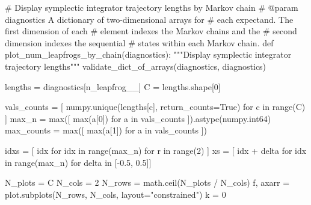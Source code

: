 \documentclass[
  letterpaper,
  DIV=11,
  numbers=noendperiod]{scrartcl}
\newenvironment{Shaded}{\begin{snugshade}}{\end{snugshade}}
\newcommand{\BuiltInTok}[1]{\textcolor[rgb]{0.00,0.23,0.31}{#1}}
\newcommand{\CommentTok}[1]{\textcolor[rgb]{0.37,0.37,0.37}{#1}}
\newcommand{\ControlFlowTok}[1]{\textcolor[rgb]{0.00,0.23,0.31}{#1}}
\newcommand{\DecValTok}[1]{\textcolor[rgb]{0.68,0.00,0.00}{#1}}
\newcommand{\FloatTok}[1]{\textcolor[rgb]{0.68,0.00,0.00}{#1}}
\newcommand{\KeywordTok}[1]{\textcolor[rgb]{0.00,0.23,0.31}{#1}}
\newcommand{\NormalTok}[1]{\textcolor[rgb]{0.00,0.23,0.31}{#1}}
\newcommand{\OperatorTok}[1]{\textcolor[rgb]{0.37,0.37,0.37}{#1}}
\newcommand{\StringTok}[1]{\textcolor[rgb]{0.13,0.47,0.30}{#1}}
\newcommand{\VariableTok}[1]{\textcolor[rgb]{0.07,0.07,0.07}{#1}}
\begin{document}
\begin{Shaded}
\begin{Highlighting}[]
\CommentTok{\# Display symplectic integrator trajectory lengths by Markov chain}
\CommentTok{\# @param diagnostics A dictionary of two{-}dimensional arrays for}
\CommentTok{\#                    each expectand.  The first dimension of each}
\CommentTok{\#                    element indexes the Markov chains and the}
\CommentTok{\#                    second dimension indexes the sequential}
\CommentTok{\#                    states within each Markov chain.}
\KeywordTok{def}\NormalTok{ plot\_num\_leapfrogs\_by\_chain(diagnostics):}
  \CommentTok{"""Display symplectic integrator trajectory lengths"""}
\NormalTok{  validate\_dict\_of\_arrays(diagnostics, }\StringTok{\textquotesingle{}diagnostics\textquotesingle{}}\NormalTok{)}

\NormalTok{  lengths }\OperatorTok{=}\NormalTok{ diagnostics[}\StringTok{\textquotesingle{}n\_leapfrog\_\_\textquotesingle{}}\NormalTok{]}
\NormalTok{  C }\OperatorTok{=}\NormalTok{ lengths.shape[}\DecValTok{0}\NormalTok{]}

\NormalTok{  vals\_counts }\OperatorTok{=}\NormalTok{ [ numpy.unique(lengths[c], return\_counts}\OperatorTok{=}\VariableTok{True}\NormalTok{)}
                  \ControlFlowTok{for}\NormalTok{ c }\KeywordTok{in} \BuiltInTok{range}\NormalTok{(C) ]}
\NormalTok{  max\_n }\OperatorTok{=} \BuiltInTok{max}\NormalTok{([ }\BuiltInTok{max}\NormalTok{(a[}\DecValTok{0}\NormalTok{]) }\ControlFlowTok{for}\NormalTok{ a }\KeywordTok{in}\NormalTok{ vals\_counts ]).astype(numpy.int64)}
\NormalTok{  max\_counts }\OperatorTok{=} \BuiltInTok{max}\NormalTok{([ }\BuiltInTok{max}\NormalTok{(a[}\DecValTok{1}\NormalTok{]) }\ControlFlowTok{for}\NormalTok{ a }\KeywordTok{in}\NormalTok{ vals\_counts ])}

\NormalTok{  idxs }\OperatorTok{=}\NormalTok{ [ idx }\ControlFlowTok{for}\NormalTok{ idx }\KeywordTok{in} \BuiltInTok{range}\NormalTok{(max\_n) }\ControlFlowTok{for}\NormalTok{ r }\KeywordTok{in} \BuiltInTok{range}\NormalTok{(}\DecValTok{2}\NormalTok{) ]}
\NormalTok{  xs }\OperatorTok{=}\NormalTok{ [ idx }\OperatorTok{+}\NormalTok{ delta }\ControlFlowTok{for}\NormalTok{ idx }\KeywordTok{in} \BuiltInTok{range}\NormalTok{(max\_n) }\ControlFlowTok{for}\NormalTok{ delta }\KeywordTok{in}\NormalTok{ [}\OperatorTok{{-}}\FloatTok{0.5}\NormalTok{, }\FloatTok{0.5}\NormalTok{]]}

\NormalTok{  N\_plots }\OperatorTok{=}\NormalTok{ C}
\NormalTok{  N\_cols }\OperatorTok{=} \DecValTok{2}
\NormalTok{  N\_rows }\OperatorTok{=}\NormalTok{ math.ceil(N\_plots }\OperatorTok{/}\NormalTok{ N\_cols)}
\NormalTok{  f, axarr }\OperatorTok{=}\NormalTok{ plot.subplots(N\_rows, N\_cols, layout}\OperatorTok{=}\StringTok{"constrained"}\NormalTok{)}
\NormalTok{  k }\OperatorTok{=} \DecValTok{0}


\end{Highlighting}
\end{Shaded}
\end{document}
